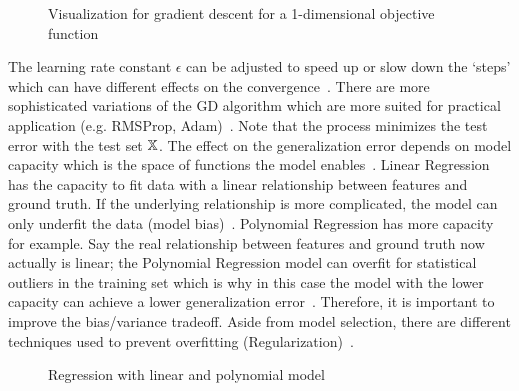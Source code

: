 \begin{figure}[hb]
    \centering
    
    \caption[Gradient descent visualization]{%
        Visualization for gradient descent for
        a 1-dimensional objective function~\citep{goodfellow_deep_2016}\label{fig:grad-desc}
    }
\end{figure}
The learning rate constant $\epsilon$ can be adjusted to speed up or slow down the `steps' which
can have different effects on the convergence~\citep{goodfellow_deep_2016}.
There are more sophisticated variations of the \ac{GD} algorithm which are more suited for practical
application (e.g. RMSProp, Adam)~\citep{geron_hands-machine_2017}.
Note that the process minimizes the test error with the test set $\mathbb{X}$.
The effect on the generalization error depends on model capacity which is the space of functions
the model enables~\citep{goodfellow_deep_2016}.
Linear Regression has the capacity to fit data with a linear relationship between features and
ground truth.
If the underlying relationship is more complicated, the model can only underfit the data (model
bias)~\citep{goodfellow_deep_2016}.
Polynomial Regression has more capacity for example.
Say the real relationship between features and ground truth now actually is linear;
the Polynomial Regression model can overfit for statistical outliers in the training set which is why
in this case the model with the lower capacity can achieve a lower generalization
error~\citep{geron_hands-machine_2017}.
Therefore, it is important to improve the bias/variance tradeoff.
Aside from model selection, there are different techniques used to prevent overfitting
(Regularization)~\citep{goodfellow_deep_2016}.
\begin{figure}[h]
    \centering
    \caption[Regression over- and underfitting]{%
        Regression with linear and polynomial model\label{fig:examples}
    }
\end{figure}

